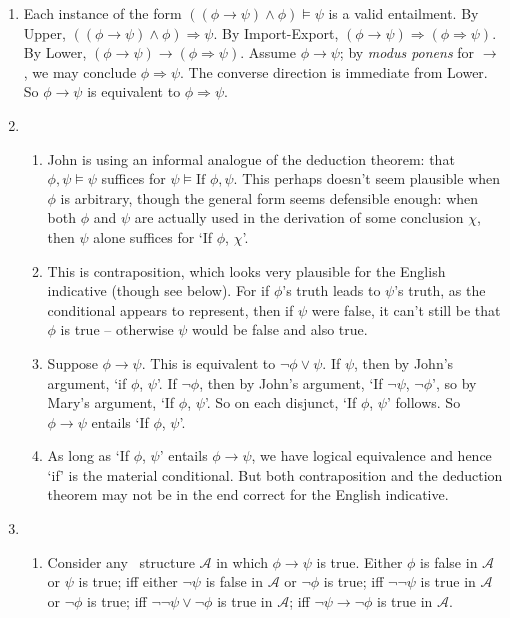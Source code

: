 {{\small
 \begin{enumerate}
\item Each instance of the form $((\phi \to \psi)\wedge\phi)\vDash\psi$ is a valid entailment. By Upper, $((\phi \to \psi)\wedge\phi)\Rightarrow\psi$. By Import-Export, $(\phi\to\psi)\Rightarrow(\phi\Rightarrow\psi)$. By Lower, $(\phi\to\psi)\to(\phi\Rightarrow\psi)$. Assume $\phi\to\psi$; by \emph{modus ponens} for $\to$, we may conclude $\phi\Rightarrow\psi$. The converse direction is immediate from Lower. So $\phi\to\psi$ is equivalent to $\phi\Rightarrow\psi$.
\item \begin{enumerate}
	\item John is using an informal analogue of the deduction theorem: that $\phi,\psi\vDash\psi$ suffices for $\psi\vDash\text{If }\phi, \psi$. This perhaps doesn't seem plausible when $\phi$ is arbitrary, though the general form seems defensible enough: when both $\phi$ and $\psi$ are actually used in the derivation of some conclusion $\chi$, then $\psi$ alone suffices for `If $\phi$, $\chi$'.
	\item This is contraposition, which looks very plausible for the English indicative (though see below). For if $\phi$'s truth leads to $\psi$'s truth, as the conditional appears to represent, then if $\psi$ were false, it can't still be that $\phi$ is true – otherwise $\psi$ would be false and also true.
	\item Suppose $\phi\to\psi$. This is equivalent to $\neg\phi\vee\psi$. If $\psi$, then by John's argument, `if $\phi$, $\psi$'. If $\neg\phi$, then by John's argument, `If $\neg\psi$, $¬\phi$', so by Mary's argument, `If $\phi$, $\psi$'. So on each disjunct, `If $\phi$, $\psi$' follows. So $\phi\to\psi$ entails `If $\phi$, $\psi$'.
	\item As long as `If $\phi$, $\psi$' entails $\phi\to\psi$, we have logical equivalence and hence `if' is the material conditional. But both contraposition and the deduction theorem may not be in the end correct for the English indicative.
\end{enumerate}
\item \begin{enumerate}
	\item Consider any \lone\ structure $\mathscr{A}$ in which $\phi\to\psi$ is true. Either $\phi$ is false in $\mathscr{A}$ or $\psi$ is true; iff either $\neg\psi$ is false in $\mathscr{A}$ or $\neg\phi$ is true; iff $\neg\neg\psi$ is true in $\mathscr{A}$ or $\neg\phi$ is true; iff $\neg\neg\psi\vee\neg\phi$ is true in $\mathscr{A}$; iff $\neg\psi\to\neg\phi$ is true in $\mathscr{A}$.

\end{enumerate}
\end{enumerate}}}

